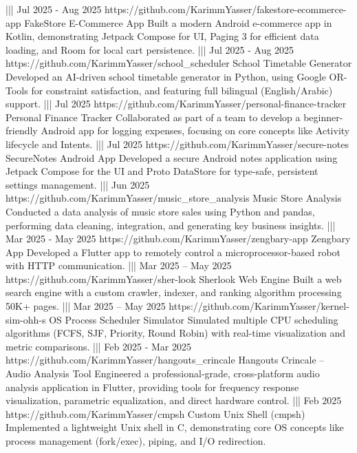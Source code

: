 {    |||
    {Jul 2025 - Aug 2025}%
    {https://github.com/KarimmYasser/fakestore-ecommerce-app}%
    {FakeStore E-Commerce App}%
    {Built a modern Android e-commerce app in Kotlin, demonstrating Jetpack Compose for UI, Paging 3 for efficient data loading, and Room for local cart persistence.}%
    |||
    {Jul 2025 - Aug 2025}%
    {https://github.com/KarimmYasser/school_scheduler}%
    {School Timetable Generator}%
    {Developed an AI-driven school timetable generator in Python, using Google OR-Tools for constraint satisfaction, and featuring full bilingual (English/Arabic) support.}%
    |||
    {Jul 2025}%
    {https://github.com/KarimmYasser/personal-finance-tracker}%
    {Personal Finance Tracker}%
    {Collaborated as part of a team to develop a beginner-friendly Android app for logging expenses, focusing on core concepts like Activity lifecycle and Intents.}%
    |||
    {Jul 2025}%
    {https://github.com/KarimmYasser/secure-notes}%
    {SecureNotes Android App}%
    {Developed a secure Android notes application using Jetpack Compose for the UI and Proto DataStore for type-safe, persistent settings management.}%
    |||
    {Jun 2025}%
    {https://github.com/KarimmYasser/music_store_analysis}%
    {Music Store Analysis}%
    {Conducted a data analysis of music store sales using Python and pandas, performing data cleaning, integration, and generating key business insights.}%
    |||
    {Mar 2025 - May 2025}%
    {https://github.com/KarimmYasser/zengbary-app}%
    {Zengbary App}%
    {Developed a Flutter app to remotely control a microprocessor-based robot with HTTP communication.}%
    |||
    {Mar 2025 – May 2025}%
    {https://github.com/KarimmYasser/sher-look}%
    {Sherlook Web Engine}%
    {Built a web search engine with a custom crawler, indexer, and ranking algorithm processing 50K+ pages.}%
    |||
    {Mar 2025 – May 2025}%
    {https://github.com/KarimmYasser/kernel-sim-ohh-s}%
    {OS Process Scheduler Simulator}%
    {Simulated multiple CPU scheduling algorithms (FCFS, SJF, Priority, Round Robin) with real-time visualization and metric comparisons.}%
    |||
    {Feb 2025 - Mar 2025}%
    {https://github.com/KarimmYasser/hangouts_crincale}%
    {Hangouts Crincale – Audio Analysis Tool}%
    {Engineered a professional-grade, cross-platform audio analysis application in Flutter, providing tools for frequency response visualization, parametric equalization, and direct hardware control.}%
    |||
    {Feb 2025}%
    {https://github.com/KarimmYasser/cmpsh}%
    {Custom Unix Shell (cmpsh)}%
    {Implemented a lightweight Unix shell in C, demonstrating core OS concepts like process management (fork/exec), piping, and I/O redirection.}%
}
